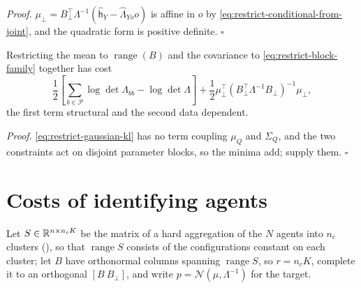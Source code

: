 \noindent\emph{Proof.}
\(\mu_\perp=B_\perp^\top\Lambda^{-1}(\widehat{\mathsf h}_Y-\widehat\Lambda_{Yo}o)\)
is affine in \(o\) by \eqref{eq:restrict-conditional-from-joint}, and the
quadratic form is positive definite. \(\square\)

Restricting the mean to \(\operatorname{range}(B)\) and the covariance to
\eqref{eq:restrict-block-family} together has cost
\begin{equation}
\frac12\left[\sum_{b\in\mathcal P}\log\det\Lambda_{bb}-\log\det\Lambda\right]
+\frac12\mu_\perp^\top\left(B_\perp^\top\Lambda^{-1}B_\perp\right)^{-1}\mu_\perp,
\label{eq:restrict-combined-cost}
\end{equation}
the first term structural and the second data dependent. 

\noindent\emph{Proof.}
\eqref{eq:restrict-gaussian-kl} has no term coupling \(\mu_Q\) and \(\Sigma_Q\),
and the two constraints act on disjoint parameter blocks, so the minima add;
 supply them.
\(\square\)

\section{Costs of identifying agents}
\label{sec:cg-restriction-costs}

Let \(S\in\mathbb R^{n\times n_cK}\) be the matrix of a hard aggregation of the \(N\)
agents into \(n_c\) clusters (), so that
\(\operatorname{range}S\) consists of the configurations constant on each
cluster; let \(B\) have orthonormal columns spanning \(\operatorname{range}S\),
so \(r=n_cK\), complete it to an orthogonal \([B\ B_\perp]\), and write
\(p=\mathcal N(\mu,\Lambda^{-1})\) for the target.

